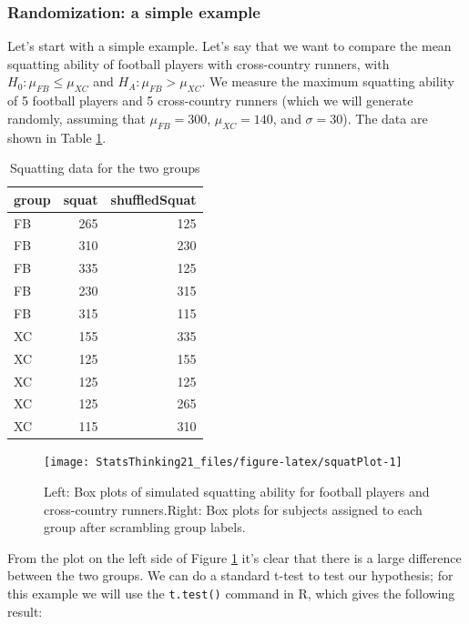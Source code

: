 \documentclass[
  12pt,
]{book}
\begin{document}
\hypertarget{randomization-a-simple-example}{%
\subsubsection{Randomization: a simple example}\label{randomization-a-simple-example}}

Let's start with a simple example. Let's say that we want to compare the mean squatting ability of football players with cross-country runners, with \(H_0: \mu_{FB} \le \mu_{XC}\) and \(H_A: \mu_{FB} > \mu_{XC}\). We measure the maximum squatting ability of 5 football players and 5 cross-country runners (which we will generate randomly, assuming that \(\mu_{FB} = 300\), \(\mu_{XC} = 140\), and \(\sigma = 30\)). The data are shown in Table \ref{tab:squatPlot}.

\begin{table}

\caption{\label{tab:squatPlot}Squatting data for the two groups}
\centering
\begin{tabular}[t]{l|r|r}
\hline
group & squat & shuffledSquat\\
\hline
FB & 265 & 125\\
\hline
FB & 310 & 230\\
\hline
FB & 335 & 125\\
\hline
FB & 230 & 315\\
\hline
FB & 315 & 115\\
\hline
XC & 155 & 335\\
\hline
XC & 125 & 155\\
\hline
XC & 125 & 125\\
\hline
XC & 125 & 265\\
\hline
XC & 115 & 310\\
\hline
\end{tabular}
\end{table}

\begin{figure}
\texttt{[image: StatsThinking21\_files/figure-latex/squatPlot-1]} \caption{Left: Box plots of simulated squatting ability for football players and cross-country runners.Right: Box plots for subjects assigned to each group after scrambling group labels.}\label{fig:squatPlot}
\end{figure}

From the plot on the left side of Figure \ref{fig:squatPlot} it's clear that there is a large difference between the two groups. We can do a standard t-test to test our hypothesis; for this example we will use the \texttt{t.test()} command in R, which gives the following result:
\end{document}
